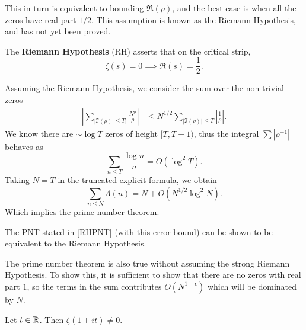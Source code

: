 This in turn is equivalent to bounding $\Re({\rho})$, and the best case is when all the zeros have real part $1/2$. This assumption is known as the Riemann Hypothesis, and has not yet been proved. 
\begin{conjecture}
	The \textbf{Riemann Hypothesis} (RH) asserts that on the critical strip, \[
		\zeta(s) = 0 \implies \Re(s) = \frac{1}{2}. 
	\]
\end{conjecture}
Assuming the Riemann Hypothesis, we consider the sum over the non trivial zeros \begin{align*}
\left|\sum_{|\Im(\rho)|\leq T|}\frac{N^\rho}{\rho}\right| &\leq N^{1/2} \sum_{|\Im(\rho)|\leq T}\left|{\frac{1}{\rho}}\right|.    
\end{align*}
We know there are $\sim \log T$ zeros of height $[T,T+1)$, thus the integral $\sum |\rho^{-1}|$ behaves as \[
\sum_{n\leq T} \frac{\log n}{n} = O(\log^2 T).
\]
Taking $N=T$ in the truncated explicit formula, we obtain \begin{equation} \label{RHPNT}
    \sum_{n\leq N} \Lambda(n) = N + O(N^{1/2}\log^2 N).
\end{equation}
Which implies the prime number theorem.
\begin{remark}
    The PNT stated in \ref{RHPNT} (with this error bound) can be shown to be equivalent to the Riemann Hypothesis.
\end{remark}
The prime number theorem is also true without assuming the strong Riemann Hypothesis. 
To show this, it is sufficient to show that there are no zeros with real part $1$, so the terms in the sum contributes $O(N^{1-\epsilon})$
which will be dominated by $N$.
\begin{theorem}\label{nozerosatone}
    Let $t\in\mathbb{R}$. Then $\zeta(1+it)\neq 0$.
\end{theorem}

